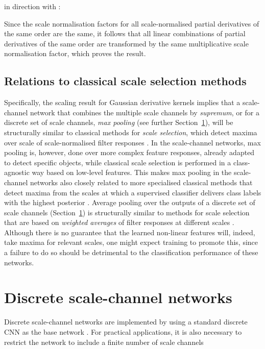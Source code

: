 \documentclass[twocolumn,runningheads]{svjour3}
\begin{document}
in direction  with 
:

Since the scale normalisation factors 
for all scale-normal\-ised partial derivatives
of the same order  are the same, it follows that all linear
combinations of partial derivatives of the same order are 
transformed by the same multiplicative scale normalisation factor, which
proves the result.

\subsection{Relations to classical scale selection methods}

Specifically, the scaling result for Gaussian derivative kernels implies that 
a scale-channel network that
combines the multiple scale channels by {\em supremum\/}, or for a discrete set of scale channels,
{\em max pooling\/} (see further Section~\ref{sec-discrete-scale-channels}), will be structurally similar to classical methods for
{\em scale selection\/}, which detect maxima over scale of
scale-normalised filter responses
\cite{Lin97-IJCV,Lin98-IJCV,Lin21-EncCompVis}. In the scale-channel networks, max pooling is,
however, done over more complex feature responses, already adapted to
detect specific objects, while classical scale selection is performed
in a class-agnostic way based on low-level features. This makes
max pooling in the scale-channel networks also closely related to more
specialised classical methods that detect maxima from the scales at
which a supervised classifier delivers class labels with the highest
posterior \cite{LiTaxLoo11-ScSp,LooLiTax09-LNCS}. 
Average pooling over the outputs of a discrete set of scale channels
(Section~\ref{sec-discrete-scale-channels}) is structurally similar to
methods for scale selection that are based on {\em weighted averages\/}
of filter responses at different scales
\cite{Lin12-JMIV,Lin15-JMIV}. Although there is no
guarantee that the learned non-linear features will, indeed, take
maxima for relevant scales, one might expect training to promote this,
since a failure to do so should be detrimental to the classification
performance of these networks.


\section{Discrete scale-channel networks}
\label{sec-discrete-scale-channels}

Discrete scale-channel networks are implemented by using a standard
discrete CNN as the base network . For practical applications,
it is also necessary to restrict the network to include a finite
number of scale channels 
\end{document}
